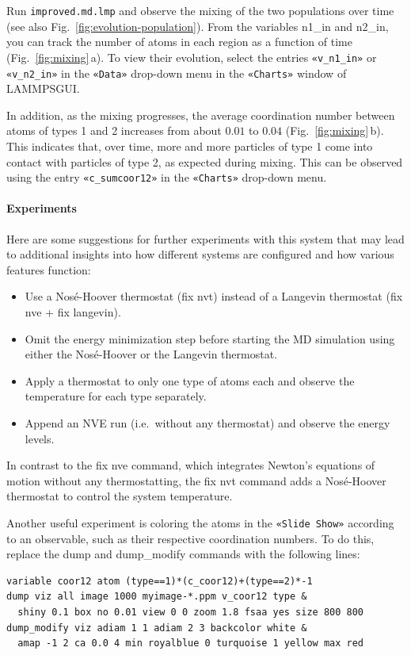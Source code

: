 \documentclass[9pt,tutorial]{livecoms}
\newcommand{\lmpcmd}[1]{\hspace{0pt}\colorbox{listing}{\textcolor{command}{\small{#1}}}\hspace{0pt}} %
\newcommand{\flecmd}[1]{\textcolor{command}{\texttt{#1}}} %
\newcommand{\guicmd}[1]{\textcolor{command}{\texttt{«#1»}}} %
\newcommand{\lammpsgui}{\textsf{LAMMPS\textendash GUI}}
\begin{document}
Run \flecmd{improved.md.lmp} and observe the mixing of the two populations
over time (see also Fig.~\ref{fig:evolution-population}).  From the
variables \lmpcmd{n1\_in} and \lmpcmd{n2\_in}, you can track the number
of atoms in each region as a function of time
(Fig.~\ref{fig:mixing}\,a).  To view their evolution, select the entries
\guicmd{v\_n1\_in} or \guicmd{v\_n2\_in} in the \guicmd{Data} drop-down
menu in the \guicmd{Charts} window of \lammpsgui{}.

In addition, as the mixing progresses, the average coordination number
between atoms of types 1 and 2 increases from about $0.01$ to $0.04$
(Fig.~\ref{fig:mixing}\,b).  This indicates that, over time, more and
more particles of type 1 come into contact with particles of type 2, as
expected during mixing.  This can be observed using the entry
\guicmd{c\_sumcoor12} in the \guicmd{Charts} drop-down menu.

\paragraph{Experiments}

Here are some suggestions for further experiments with this system that
may lead to additional insights into how different systems are configured
and how various features function:
\begin{itemize}
\item Use a Nos\'e-Hoover thermostat (\lmpcmd{fix nvt}) instead of a Langevin thermostat
  (\lmpcmd{fix nve} + \lmpcmd{fix langevin}).
\item Omit the energy minimization step before starting the MD simulation using either
the Nos\'e-Hoover or the Langevin thermostat.
\item Apply a thermostat to only one type of atoms each and observe the
  temperature for each type separately.
\item Append an NVE run (i.e.~without any thermostat) and observe the energy levels.
\end{itemize}

\begin{note}
{\color{blue}
In contrast to the \lmpcmd{fix nve} command, which integrates Newton's equations
of motion without any thermostatting, the \lmpcmd{fix nvt} command adds a Nosé-Hoover
thermostat to control the system temperature.}
\end{note}

Another useful experiment is coloring the atoms in the \guicmd{Slide Show}
according to an observable, such as their respective coordination
numbers.  To do this, replace the
\lmpcmd{dump} and \lmpcmd{dump\_modify} commands with the following lines:
\begin{lstlisting}
variable coor12 atom (type==1)*(c_coor12)+(type==2)*-1
dump viz all image 1000 myimage-*.ppm v_coor12 type &
  shiny 0.1 box no 0.01 view 0 0 zoom 1.8 fsaa yes size 800 800
dump_modify viz adiam 1 1 adiam 2 3 backcolor white &
  amap -1 2 ca 0.0 4 min royalblue 0 turquoise 1 yellow max red
\end{lstlisting}
\end{document}
